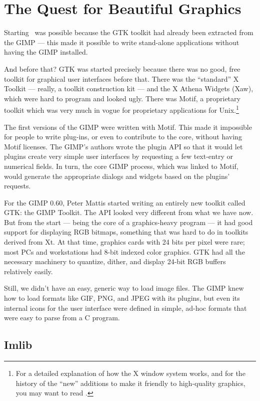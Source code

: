\chapter{The Quest for Beautiful Graphics}

Starting \GNOME\ was possible because the \gls{GTK} toolkit had already
been extracted from the \gls{GIMP} --- this made it possible to write
stand-alone applications without having the \gls{GIMP} installed.

And before that?  \gls{GTK} was started precisely because there was no
good, free toolkit for graphical user interfaces before that.  There
was the ``standard'' X Toolkit --- really, a toolkit construction kit --- and
the X Athena Widgets (Xaw), which were hard to program and looked
ugly.  There was Motif, a proprietary toolkit which was very much in
vogue for proprietary applications for Unix.\footnote{For a detailed
  explanation of how the X window system works, and for the history of
  the ``new'' additions to make it friendly to high-quality graphics,
  you may want to read \cite{magcius-xplain}.}

The first versions of the \gls{GIMP} were written with Motif.  This
made it impossible for people to write plug-ins, or even to contribute
to the core, without having Motif licenses.  The \gls{GIMP}'s authors
wrote the plugin API so that it would let plugins create very simple
user interfaces by requesting a few text-entry or numerical fields.
In turn, the core GIMP process, which was linked to Motif, would
generate the appropriate dialogs and widgets based on the plugins'
requests.

For the \gls{GIMP} 0.60, Peter Mattis started writing an entirely new
toolkit called GTK: the GIMP Toolkit.  The API looked very different
from what we have now.  But from the start --- being the core of a
graphics-heavy program --- it had good support for displaying RGB
bitmaps, something that was hard to do in toolkits derived from Xt.
At that time, graphics cards with 24 bits per pixel were rare; most
PCs and workstations had 8-bit indexed color graphics.  GTK had all
the necessary machinery to quantize, dither, and display 24-bit RGB
buffers relatively easily.

Still, we didn't have an easy, generic way to load image files.  The
GIMP knew how to load formats like GIF, PNG, and JPEG with its
plugins, but even its internal icons for the user interface were
defined in simple, ad-hoc formats that were easy to parse from a C
program.

\section{Imlib}

